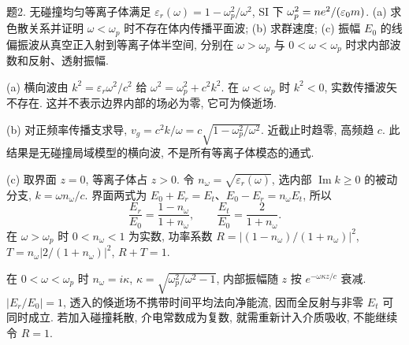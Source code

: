 \begin{exercise}
题2. 无碰撞均匀等离子体满足 $\varepsilon_r(\omega)=1-\omega_p^2/\omega^2$, SI 下 $\omega_p^2=ne^2/(\varepsilon_0 m)$. (a) 求色散关系并证明 $\omega<\omega_p$ 时不存在体内传播平面波; (b) 求群速度; (c) 振幅 $E_0$ 的线偏振波从真空正入射到等离子体半空间, 分别在 $\omega>\omega_p$ 与 $0<\omega<\omega_p$ 时求内部波数和反射、透射振幅.
\end{exercise}
\begin{solution}
(a) 横向波由 $k^2=\varepsilon_r\omega^2/c^2$ 给
$\omega^2=\omega_p^2+c^2k^2$. 在 $\omega<\omega_p$ 时 $k^2<0$, 实数传播波矢不存在. 这并不表示边界内部的场必为零, 它可为倏逝场.

(b) 对正频率传播支求导, $v_g=c^2k/\omega=c\sqrt{1-\omega_p^2/\omega^2}$. 近截止时趋零, 高频趋 $c$. 此结果是无碰撞局域模型的横向波, 不是所有等离子体模态的通式.

(c) 取界面 $z=0$, 等离子体占 $z>0$. 令 $n_\omega=\sqrt{\varepsilon_r(\omega)}$, 选内部 $\operatorname{Im}k\ge0$ 的被动分支, $k=\omega n_\omega/c$. 界面两式为 $E_0+E_r=E_t$、$E_0-E_r=n_\omega E_t$, 所以
\[
 \frac{E_r}{E_0}=\frac{1-n_\omega}{1+n_\omega},\qquad
 \frac{E_t}{E_0}=\frac2{1+n_\omega}.
\]
在 $\omega>\omega_p$ 时 $0<n_\omega<1$ 为实数, 功率系数 $R=|(1-n_\omega)/(1+n_\omega)|^2$, $T=n_\omega|2/(1+n_\omega)|^2$, $R+T=1$.

在 $0<\omega<\omega_p$ 时 $n_\omega=i\kappa$, $\kappa=\sqrt{\omega_p^2/\omega^2-1}$, 内部振幅随 $z$ 按 $e^{-\omega\kappa z/c}$ 衰减. $|E_r/E_0|=1$, 透入的倏逝场不携带时间平均法向净能流, 因而全反射与非零 $E_t$ 可同时成立. 若加入碰撞耗散, 介电常数成为复数, 就需重新计入介质吸收, 不能继续令 $R=1$.
\end{solution}

